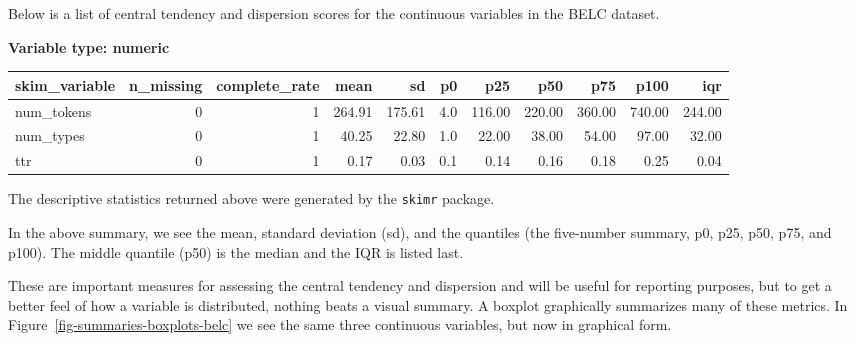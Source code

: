 \documentclass[
  letterpaper,
]{scrbook}
\begin{document}
Below is a list of central tendency and dispersion scores for the
continuous variables in the BELC dataset.

\textbf{Variable type: numeric}

\begin{tabular}{l|r|r|r|r|r|r|r|r|r|r}
\hline
skim\_variable & n\_missing & complete\_rate & mean & sd & p0 & p25 & p50 & p75 & p100 & iqr\\
\hline
num\_tokens & 0 & 1 & 264.91 & 175.61 & 4.0 & 116.00 & 220.00 & 360.00 & 740.00 & 244.00\\
\hline
num\_types & 0 & 1 & 40.25 & 22.80 & 1.0 & 22.00 & 38.00 & 54.00 & 97.00 & 32.00\\
\hline
ttr & 0 & 1 & 0.17 & 0.03 & 0.1 & 0.14 & 0.16 & 0.18 & 0.25 & 0.04\\
\hline
\end{tabular}

\begin{tcolorbox}[enhanced jigsaw, title=\textcolor{quarto-callout-warning-color}{\faExclamationTriangle}\hspace{0.5em}{Tip}, breakable, colback=white, colframe=quarto-callout-warning-color-frame, bottomrule=.15mm, left=2mm, bottomtitle=1mm, colbacktitle=quarto-callout-warning-color!10!white, opacityback=0, arc=.35mm, toprule=.15mm, coltitle=black, leftrule=.75mm, opacitybacktitle=0.6, toptitle=1mm, titlerule=0mm, rightrule=.15mm]

The descriptive statistics returned above were generated by the
\texttt{skimr} package.

\end{tcolorbox}

In the above summary, we see the mean, standard deviation (sd), and the
quantiles (the five-number summary, p0, p25, p50, p75, and p100). The
middle quantile (p50) is the median and the IQR is listed last.

These are important measures for assessing the central tendency and
dispersion and will be useful for reporting purposes, but to get a
better feel of how a variable is distributed, nothing beats a visual
summary. A boxplot graphically summarizes many of these metrics. In
Figure~\ref{fig-summaries-boxplots-belc} we see the same three
continuous variables, but now in graphical form.
\end{document}
